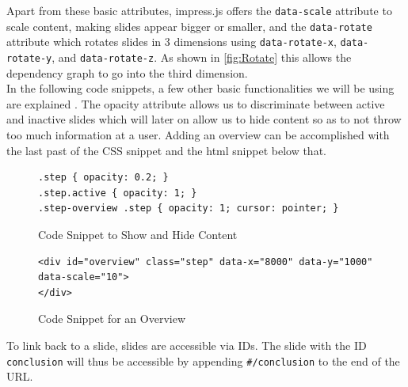 \documentclass[twoside, 12pt]{article}
\begin{document}
Apart from these basic attributes, impress.js offers the \texttt{data-scale} attribute to scale content, making slides appear bigger or smaller, and the \texttt{data-rotate} attribute which rotates slides in 3 dimensions using \texttt{data-rotate-x}, \texttt{data-rotate-y}, and \texttt{data-rotate-z}. As shown in \autoref{fig:Rotate} this allows the dependency graph to go into the third dimension.\\

In the following code snippets, a few other basic functionalities we will be using are explained \cite{andismith:npentrel15}. The opacity attribute allows us to discriminate between active and inactive slides which will later on allow us to hide content so as to not throw too much information at a user. Adding an overview can be accomplished with the last past of the CSS snippet and the html snippet below that.\\

\begin{figure}
\vspace{-26pt}
\begin{verbatim}
.step { opacity: 0.2; }
.step.active { opacity: 1; }
.step-overview .step { opacity: 1; cursor: pointer; }
\end{verbatim}
\vspace{-5pt}
  \caption{Code Snippet to Show and Hide Content}
  \label{fig:SSlide}
  \vspace{30pt}
\end{figure}

\begin{figure}
\vspace{-26pt}
\begin{verbatim}
<div id="overview" class="step" data-x="8000" data-y="1000" data-scale="10">
</div>
\end{verbatim}
\vspace{-7pt}
  \caption{Code Snippet for an Overview}
  \label{fig:SSlide}
  \vspace{12pt}
\end{figure}

\begin{figure}
\vspace{-50pt}
\end{figure}

To link back to a slide, slides are accessible via IDs. The slide with the ID \texttt{conclusion} will thus be accessible by appending \texttt{\#/conclusion} to the end of the URL.
\end{document}
